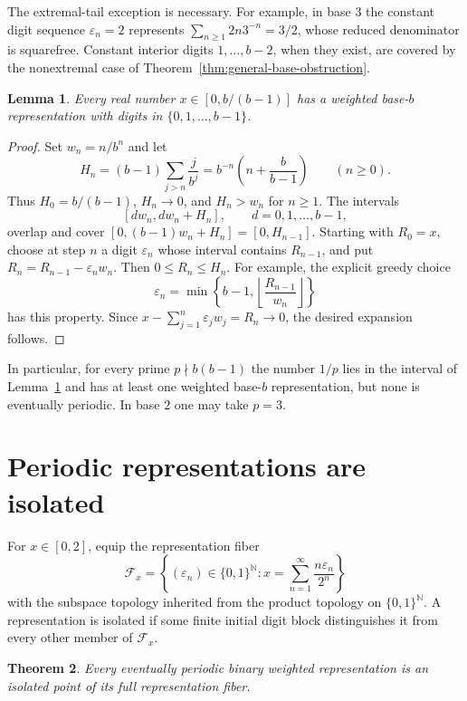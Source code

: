 \documentclass[11pt]{article}
\newtheorem{theorem}{Theorem}[section]
\newtheorem{lemma}[theorem]{Lemma}
\theoremstyle{definition}
\theoremstyle{remark}
\begin{document}
The extremal-tail exception is necessary.  For example, in base $3$
the constant digit sequence $\varepsilon_n=2$ represents
$\sum_{n\geq1}2n3^{-n}=3/2$, whose reduced denominator is squarefree.
Constant interior digits $1,\ldots,b-2$, when they exist, are covered
by the nonextremal case of Theorem~\ref{thm:general-base-obstruction}.

\begin{lemma}\label{lem:general-base-existence}
Every real number $x\in[0,b/(b-1)]$ has a weighted base-$b$
representation with digits in $\{0,1,\ldots,b-1\}$.
\end{lemma}

\begin{proof}
Set $w_n=n/b^n$ and let
\[
 H_n=(b-1)\sum_{j>n}\frac{j}{b^j}
     =b^{-n}\left(n+\frac{b}{b-1}\right)
     \qquad(n\geq0).
\]
Thus $H_0=b/(b-1)$, $H_n\to0$, and
$H_n>w_n$ for $n\geq1$.  The intervals
\[
 [d w_n,d w_n+H_n],\qquad d=0,1,\ldots,b-1,
\]
overlap and cover
$[0,(b-1)w_n+H_n]=[0,H_{n-1}]$.
Starting with $R_0=x$, choose at step $n$ a digit $\varepsilon_n$
whose interval contains $R_{n-1}$, and put
$R_n=R_{n-1}-\varepsilon_n w_n$.  Then $0\leq R_n\leq H_n$.
For example, the explicit greedy choice
\[
 \varepsilon_n=
 \min\left\{b-1,\left\lfloor\frac{R_{n-1}}{w_n}\right\rfloor\right\}
\]
has this property.  Since
$x-\sum_{j=1}^{n}\varepsilon_j w_j=R_n\to0$, the desired expansion
follows.
\end{proof}

In particular, for every prime $p\nmid b(b-1)$ the number $1/p$ lies
in the interval of Lemma~\ref{lem:general-base-existence} and has at
least one weighted base-$b$ representation, but none is eventually
periodic.  In base $2$ one may take $p=3$.

\section{Periodic representations are isolated}
\label{sec:periodic-isolation}

For $x\in[0,2]$, equip the representation fiber
\[
 \mathcal F_x=
 \left\{(\varepsilon_n)\in\{0,1\}^{\mathbb N}:
       x=\sum_{n=1}^{\infty}\frac{n\varepsilon_n}{2^n}\right\}
\]
with the subspace topology inherited from the product topology on
$\{0,1\}^{\mathbb N}$.  A representation is isolated if some finite
initial digit block distinguishes it from every other member of
$\mathcal F_x$.

\begin{theorem}\label{thm:periodic-isolation}
Every eventually periodic binary weighted representation is an
isolated point of its full representation fiber.
\end{theorem}
\end{document}
